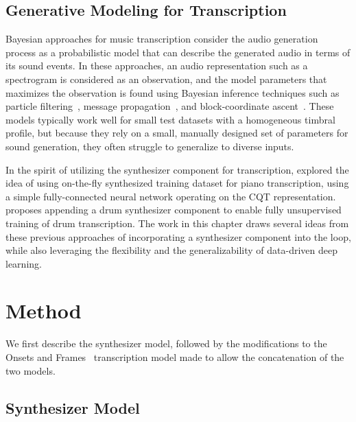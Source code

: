 
\subsection{Generative Modeling for Transcription}

Bayesian approaches for music transcription consider the audio generation process as a probabilistic model that can describe the generated audio in terms of its sound events.
In these approaches, an audio representation such as a spectrogram is considered as an observation, and the model parameters that maximizes the observation is found using Bayesian inference techniques such as particle filtering~\cite{dubois2005harmonic}, message propagation~\cite{cemgil2006generative}, and block-coordinate ascent~\cite{bergkirkpatrick2014unsupervised}.
These models typically work well for small test datasets with a homogeneous timbral profile, but because they rely on a small, manually designed set of parameters for sound generation, they often struggle to generalize to diverse inputs.

In the spirit of utilizing the synthesizer component for transcription,
 explored the idea of using on-the-fly synthesized training dataset for piano transcription, using a simple fully-connected neural network operating on the CQT representation.
\cite{choi2019drum} proposes appending a drum synthesizer component to enable fully unsupervised training of drum transcription.
The work in this chapter draws several ideas from these previous approaches of incorporating a synthesizer component into the loop, while also leveraging the flexibility and the generalizability of data-driven deep learning.

\section{Method}

We first describe the synthesizer model, followed by the modifications to the Onsets and Frames~\cite{hawthorne2018onsetsframes} transcription model made to allow the concatenation of the two models.

\subsection{Synthesizer Model}

